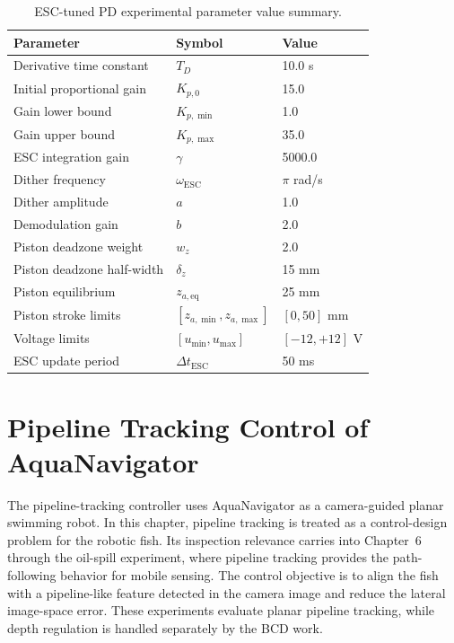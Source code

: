\documentclass{uhcoethesis}
\begin{document}
\begin{table}[t]
    \centering
    \caption{ESC-tuned PD experimental parameter value summary.}
    \label{tab:ch3_esc_parameters}
    \begin{tabular}{lll}
        \hline
        Parameter & Symbol & Value \\
        \hline
        Derivative time constant & $T_D$ & 10.0 s \\
        Initial proportional gain & $K_{p,0}$ & 15.0 \\
        Gain lower bound & $K_{p,\min}$ & 1.0 \\
        Gain upper bound & $K_{p,\max}$ & 35.0 \\
        ESC integration gain & $\gamma$ & 5000.0 \\
        Dither frequency & $\omega_{\mathrm{ESC}}$ & $\pi$ rad/s \\
        Dither amplitude & $a$ & 1.0 \\
        Demodulation gain & $b$ & 2.0 \\
        Piston deadzone weight & $w_z$ & 2.0 \\
        Piston deadzone half-width & $\delta_z$ & 15 mm \\
        Piston equilibrium & $z_{a,\mathrm{eq}}$ & 25 mm \\
        Piston stroke limits & $[z_{a,\min},z_{a,\max}]$ & $[0,50]$ mm \\
        Voltage limits & $[u_{\min},u_{\max}]$ & $[-12,+12]$ V \\
        ESC update period & $\Delta t_{\mathrm{ESC}}$ & 50 ms \\
        \hline
    \end{tabular}
\end{table}

\section{Pipeline Tracking Control of AquaNavigator}

The pipeline-tracking controller uses AquaNavigator as a camera-guided planar swimming robot. In this chapter, pipeline tracking is treated as a control-design problem for the robotic fish. Its inspection relevance carries into Chapter~6 through the oil-spill experiment, where pipeline tracking provides the path-following behavior for mobile sensing. The control objective is to align the fish with a pipeline-like feature detected in the camera image and reduce the lateral image-space error. These experiments evaluate planar pipeline tracking, while depth regulation is handled separately by the BCD work.
\end{document}
